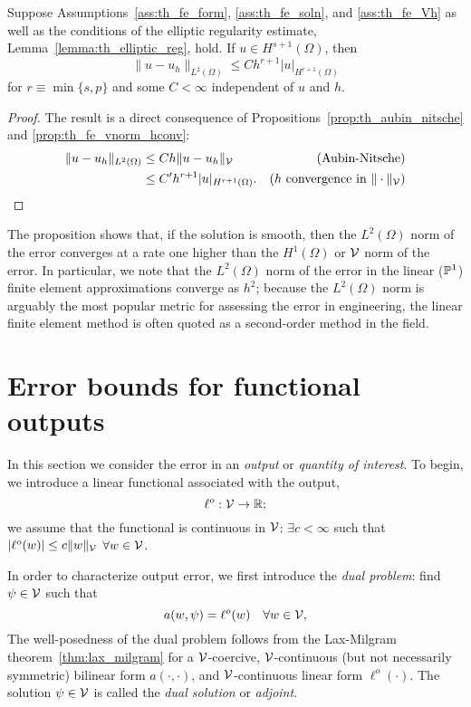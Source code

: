 \begin{proposition}
  Suppose Assumptions~\ref{ass:th_fe_form}, \ref{ass:th_fe_soln}, and \ref{ass:th_fe_Vh} as well as the conditions of the elliptic regularity estimate, Lemma~\ref{lemma:th_elliptic_reg}, hold. If $u \in H^{s+1}(\Omega)$, then
  \begin{equation*}
    \| u - u_h \|_{L^2(\Omega)} \leq C h^{r+1} | u |_{H^{r+1}(\Omega)}
  \end{equation*}
  for $r \equiv \min\{ s,p\}$ and some $C < \infty$ independent of $u$ and $h$.
  \begin{proof}
    The result is a direct consequence of Propositions~\ref{prop:th_aubin_nitsche} and \ref{prop:th_fe_vnorm_hconv}:
    \begin{align*}
      \| u - u_h \|_{L^2(\Omega)}
      &\leq C h \| u-u_h \|_{\mathcal{V}} & \text{(Aubin-Nitsche)} \\
      &\leq C' h^{r+1} | u |_{H^{r+1}(\Omega)} . &\text{($h$ convergence in $\| \cdot \|_{\mathcal{V}}$)} 
    \end{align*}
  \end{proof}
\end{proposition}
The proposition shows that, if the solution is smooth, then the $L^2(\Omega)$ norm of the error converges at a rate one higher than the $H^1(\Omega)$ or $\mathcal{V}$ norm of the error.  In particular, we note that the $L^2(\Omega)$ norm of the error in the linear ($\mathbb{P}^1$) finite element approximations converge as $h^2$; because the $L^2(\Omega)$ norm is arguably the most popular metric for assessing the error in engineering, the linear finite element method is often quoted as a second-order method in the field.

\section{Error bounds for functional outputs}
In this section we consider the error in an \emph{output} or \emph{quantity of interest}. To begin, we introduce a linear functional associated with the output,
\begin{equation*}
  \ell^o : \mathcal{V} \to \mathbb{R};
\end{equation*}
we assume that the functional is continuous in $\mathcal{V}$: $\exists c < \infty$ such that $| \ell^o(w) | \leq c \| w \|_{\mathcal{V}}$ $\forall w \in \mathcal{V}$.

In order to characterize output error, we first introduce the \emph{dual problem}: find $\psi \in \mathcal{V}$ such that
\begin{equation}
  \label{eq:th_dual}
  a(w,\psi) = \ell^o(w) \quad \forall w \in \mathcal{V},
\end{equation}
The well-posedness of the dual problem follows from the Lax-Milgram theorem~\ref{thm:lax_milgram} for a $\mathcal{V}$-coercive, $\mathcal{V}$-continuous (but not necessarily symmetric) bilinear form $a(\cdot,\cdot)$, and $\mathcal{V}$-continuous linear form $\ell^o(\cdot)$.  The solution $\psi \in \mathcal{V}$ is called the \emph{dual solution} or \emph{adjoint}.

